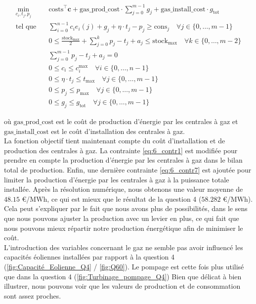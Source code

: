 \documentclass{article}
\begin{document}
\begin{align}
    \min_{c_{i},t_j,p_j} \quad &\mathrm{costs}^\intercal\mathbf{c} + \mathrm{gas\_prod\_cost}\cdot \sum_{j=0}^{m-1} g_j + \mathrm{gas\_install\_cost} \cdot g_\mathrm{tot}\nonumber\\
    \textrm{tel que} \quad & \sum_{i=0}^{n-1} c_i e_i(j) + g_j + \eta \cdot t_j - p_j \ge \mathrm{cons}_j \quad \forall j \in  \{ 0, \ldots, m-1 \}\label{eq:6_contr1}\\
    & 0 \le \frac{\mathrm{stock}_\mathrm{max}}{2}  + \sum_{j=0}^{k} p_j - t_j + a_j \le  \mathrm{stock}_\mathrm{max} \quad \forall k \in \{ 0, \ldots, m-2 \}\label{eq:6_contr2}\\
    & \sum_{j=0}^{m-1} p_j - t_j + a_j = 0 \label{eq:6_contr3}\\
    & 0 \le c_i \le c_i^\mathrm{max} \quad \forall i \in  \{ 0, \ldots, n-1 \}  \label{eq:6_contr4}\\
    & 0 \le \eta \cdot t_j \le  t_\mathrm{max} \quad \forall j \in  \{ 0, \ldots, m-1 \}  \label{eq:6_contr5}\\
    & 0 \le p_j \le  p_\mathrm{max} \quad \forall j \in  \{ 0, \ldots, m-1 \} \label{eq:6_contr6}\\
    & 0 \le g_j \le g_\mathrm{tot} \quad \forall j \in  \{ 0, \ldots, m-1 \} \label{eq:6_contr7}
\end{align}

\noindent où $\mathrm{gas\_prod\_cost}$ est le coût de production d'énergie par les centrales à gaz et $\mathrm{gas\_install\_cost}$ est le coût d'installation des centrales à gaz.\\
La fonction objectif tient maintenant compte du coût d'installation et de production des centrales à gaz. La contrainte \eqref{eq:6_contr1} est modifiée pour prendre en compte la production d'énergie par les centrales à gaz dans le bilan total de production. 
Enfin, une dernière contrainte \eqref{eq:6_contr7} est ajoutée pour limiter la production d'énergie par les centrales à gaz à la puissance totale installée.
Après la résolution numérique, nous obtenons une valeur moyenne de $\mathbf{48.15}$ \euro/MWh, ce qui est mieux que 
le résultat de la question 4 ($\mathbf{58.282}$ \euro/MWh). Cela peut s'expliquer par le fait que nous
avons plus de possibilités, dans le sens que nous pouvons ajuster la production avec un levier en plus,
ce qui fait que nous pouvons mieux répartir notre production énergétique afin de minimiser le coût. \\
L'introduction des variables concernant le gaz ne semble pas avoir influencé les capacités éoliennes installées 
par rapport à la question 4 (\autoref{fig:Capacité_Eolienne_Q4} / \autoref{fig:Q60}). 
Le pompage est cette fois plus utilisé que dans la question 4 (\autoref{fig:Turbinage_pompage_Q4})
Bien que délicat à bien illustrer, nous pouvons voir que les valeurs de production et de consommation sont 
assez proches.
\end{document}
